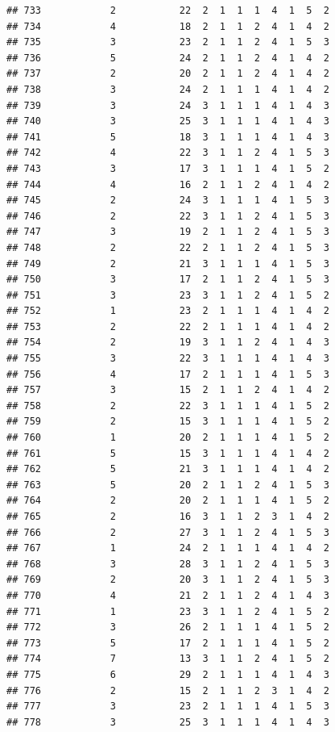 \documentclass[12pt,]{krantz}
\theoremstyle{definition}
\theoremstyle{definition}
\theoremstyle{remark}
\begin{document}
\begin{verbatim}
## 733            2           22  2  1  1  1  4  1  5  2
## 734            4           18  2  1  1  2  4  1  4  2
## 735            3           23  2  1  1  2  4  1  5  3
## 736            5           24  2  1  1  2  4  1  4  2
## 737            2           20  2  1  1  2  4  1  4  2
## 738            3           24  2  1  1  1  4  1  4  2
## 739            3           24  3  1  1  1  4  1  4  3
## 740            3           25  3  1  1  1  4  1  4  3
## 741            5           18  3  1  1  1  4  1  4  3
## 742            4           22  3  1  1  2  4  1  5  3
## 743            3           17  3  1  1  1  4  1  5  2
## 744            4           16  2  1  1  2  4  1  4  2
## 745            2           24  3  1  1  1  4  1  5  3
## 746            2           22  3  1  1  2  4  1  5  3
## 747            3           19  2  1  1  2  4  1  5  3
## 748            2           22  2  1  1  2  4  1  5  3
## 749            2           21  3  1  1  1  4  1  5  3
## 750            3           17  2  1  1  2  4  1  5  3
## 751            3           23  3  1  1  2  4  1  5  2
## 752            1           23  2  1  1  1  4  1  4  2
## 753            2           22  2  1  1  1  4  1  4  2
## 754            2           19  3  1  1  2  4  1  4  3
## 755            3           22  3  1  1  1  4  1  4  3
## 756            4           17  2  1  1  1  4  1  5  3
## 757            3           15  2  1  1  2  4  1  4  2
## 758            2           22  3  1  1  1  4  1  5  2
## 759            2           15  3  1  1  1  4  1  5  2
## 760            1           20  2  1  1  1  4  1  5  2
## 761            5           15  3  1  1  1  4  1  4  2
## 762            5           21  3  1  1  1  4  1  4  2
## 763            5           20  2  1  1  2  4  1  5  3
## 764            2           20  2  1  1  1  4  1  5  2
## 765            2           16  3  1  1  2  3  1  4  2
## 766            2           27  3  1  1  2  4  1  5  3
## 767            1           24  2  1  1  1  4  1  4  2
## 768            3           28  3  1  1  2  4  1  5  3
## 769            2           20  3  1  1  2  4  1  5  3
## 770            4           21  2  1  1  2  4  1  4  3
## 771            1           23  3  1  1  2  4  1  5  2
## 772            3           26  2  1  1  1  4  1  5  2
## 773            5           17  2  1  1  1  4  1  5  2
## 774            7           13  3  1  1  2  4  1  5  2
## 775            6           29  2  1  1  1  4  1  4  3
## 776            2           15  2  1  1  2  3  1  4  2
## 777            3           23  2  1  1  1  4  1  5  3
## 778            3           25  3  1  1  1  4  1  4  3

\end{verbatim}
\end{document}
